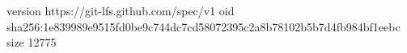 version https://git-lfs.github.com/spec/v1
oid sha256:1e839989e9515fd0be9c744dc7cd58072395c2a8b78102b5b7d4fb984bf1eebc
size 12775
